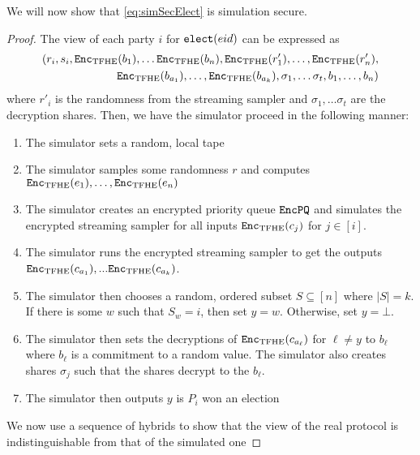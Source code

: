 \begin{lemma}
	We will now show that \cref{eq:simSecElect} is simulation secure.
	\begin{proof}
		The view of each party $i$ for $\texttt{elect}({eid})$ can be expressed as
		\begin{align*}
			(r_i,  s_i, \texttt{Enc}_{\mathrm{TFHE}}(b_{1}), \dots \texttt{Enc}_{\mathrm{TFHE}}(b_n), \texttt{Enc}_{\mathrm{TFHE}}(r'_1), \dots, \texttt{Enc}_{\mathrm{TFHE}}(r'_n), \\
				\texttt{Enc}_{\mathrm{TFHE}}(b_{a_1}), \dots, \texttt{Enc}_{\mathrm{TFHE}}(b_{a_k}), \sigma_1, \dots \sigma_t, b_1, \dots, b_n)
		\end{align*}
		where $r'_i$ is the randomness from the streaming sampler and $\sigma_1, \dots \sigma_t$ are the decryption shares.
		Then, we have the simulator proceed in the following manner:
		\begin{enumerate}
			\item The simulator sets a random, local tape
			\item The simulator samples some randomness $r$ and computes $\texttt{Enc}_{\mathrm{TFHE}}(e_1), \dots, \texttt{Enc}_{\mathrm{TFHE}}(e_n)$
			\item The simulator creates an encrypted priority queue $\texttt{EncPQ}$ and simulates the encrypted streaming sampler for all inputs $\texttt{Enc}_{\mathrm{TFHE}}(c_j)$ for $j \in [i]$.
			\item The simulator runs the encrypted streaming sampler to get the outputs $\texttt{Enc}_{\mathrm{TFHE}}(c_{a_1}),... \texttt{Enc}_{\mathrm{TFHE}}(c_{a_k})$.
			\item The simulator then chooses a random, ordered subset $S \subseteq [n]$ where $|S| = k$. 
			If there is some $w$ such that $S_w = i$, then set $y = w$. Otherwise, set $y = \bot$.
			\item The simulator then sets the decryptions of $\texttt{Enc}_{\mathrm{TFHE}}(c_{a_\ell})$ for $\ell \neq y$ to $b_\ell$ where $b_\ell$ is a commitment to a random value.
			The simulator also creates shares $\sigma_j$ such that the shares decrypt to the $b_\ell$.
			\item The simulator then outputs $y$ is $P_i$ won an election
			
		\end{enumerate}
		We now use a sequence of hybrids to show that the view of the real protocol is indistinguishable from
		that of the simulated one


\end{proof}
\end{lemma}
